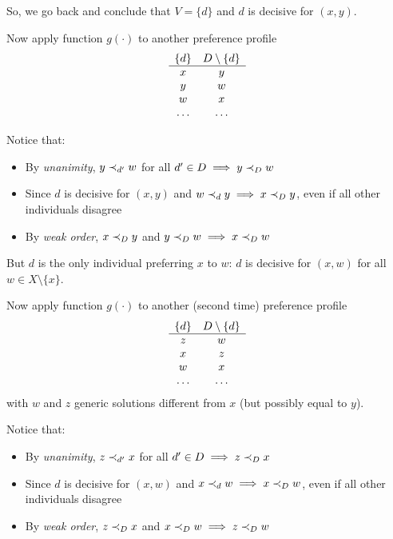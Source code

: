 So, we go back and conclude that $V = \{d\}$ and $d$ is decisive for $(x, y)$.

Now apply function $g (\cdot)$ to another preference profile 
$$
\begin{array}{c c}
	\{d\} & D \setminus \{d\} \\
	\hline
	x & y \\
	y & w \\
	w & x \\
	\dots & \dots
\end{array}
$$

Notice that: 
\begin{itemize}
	\item By \textit{unanimity}, $y \prec_{d'} w$ for all $d' \in D \implies y \prec_{D} w$
	
	\item Since $d$ is decisive for $(x,y)$ and $w \prec_{d} y \implies x \prec_{D} y$, even if all other individuals disagree
	
	\item By \textit{weak order}, $x \prec_{D} y$ and $y \prec_{D} w \implies x \prec_{D} w$
\end{itemize}

But $d$ is the only individual preferring $x$ to $w$: $d$ is decisive for $(x, w)$ for all $w \in X \setminus \{x\}$.

Now apply function $g (\cdot)$ to another (second time) preference profile 
$$
\begin{array}{c c}
	\{d\} & D \setminus \{d\} \\
	\hline
	z & w \\
	x & z \\
	w & x \\
	\dots & \dots
\end{array}
$$
with $w$ and $z$ generic solutions different from $x$ (but possibly equal to $y$).

Notice that: 
\begin{itemize}
	\item By \textit{unanimity}, $z \prec_{d'} x$ for all $d' \in D \implies z \prec_{D} x$
	
	\item Since $d$ is decisive for $(x,w)$ and $x \prec_{d} w \implies x \prec_{D} w$, even if all other individuals disagree
	
	\item By \textit{weak order}, $z \prec_{D} x$ and $x \prec_{D} w \implies z \prec_{D} w$
\end{itemize}

